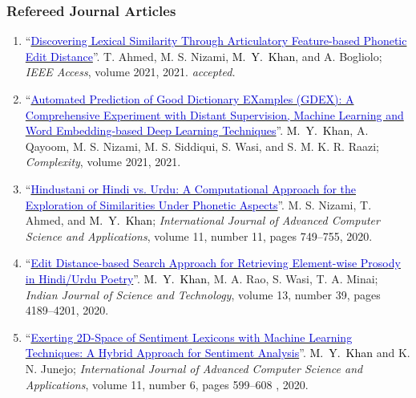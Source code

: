 \documentclass[a4paper, 10pt]{article}
\begin{document}
\subsubsection*{{ Refereed Journal Articles}}
\begin{enumerate}[J\arabic*.] 
\itemsep = 0em

\item ``\href{https://arxiv.org/abs/2008.06865}{\textcolor{MediumBlue}{Discovering Lexical Similarity Through Articulatory Feature-based Phonetic Edit Distance}}''. T. Ahmed, M. S. Nizami, \textcolor{Black}{M.~Y.~Khan}, and A. Bogliolo; \emph{IEEE Access}, volume 2021, 2021. \qonetag{\textcolor{white}{\textsf\bfseries Q1}}   {\small\it accepted.}

\item ``\href{https://doi.org/10.1155/2021/2553199}{\textcolor{MediumBlue}{Automated Prediction of Good Dictionary EXamples (GDEX): A Comprehensive Experiment with Distant Supervision, Machine Learning and Word Embedding-based Deep Learning Techniques}}''. \textcolor{Black}{M.~Y.~Khan}, A. Qayoom, M. S. Nizami, M. S. Siddiqui, S. Wasi, and S. M. K. R. Raazi; \emph{Complexity}, volume 2021, 2021. \qonetag{\textcolor{white}{\textsf\bfseries Q1}}  

\item ``\href{https://dx.doi.org/10.14569/IJACSA.2020.0111191}{\textcolor{MediumBlue}{Hindustani or Hindi vs. Urdu: A Computational Approach for the Exploration of Similarities Under Phonetic Aspects}}''. M. S. Nizami, T. Ahmed, and \textcolor{Black}{M.~Y.~Khan}; \emph{International Journal of Advanced Computer Science and Applications}, volume 11, number 11, pages 749--755, 2020. \qthreetag{\textcolor{white}{\textsf\bfseries Q3}} 

\item ``\href{https://doi.org/10.17485/IJST/v13i39.1489}{\textcolor{MediumBlue}{Edit Distance-based Search Approach for Retrieving Element-wise Prosody in Hindi/Urdu Poetry}}''. \textcolor{Black}{M.~Y.~Khan}, M. A. Rao, S. Wasi, T. A. Minai; \emph{Indian Journal of Science and Technology}, volume 13, number 39, pages 4189--4201, 2020. 

\item ``\href{https://doi.org/10.14569/IJACSA.2020.0110672}{\textcolor{MediumBlue}{Exerting 2D-Space of Sentiment Lexicons with Machine Learning Techniques: A Hybrid Approach for Sentiment Analysis}}''. \textcolor{Black}{M.~Y.~Khan} and K. N. Junejo; \emph{International Journal of Advanced Computer Science and Applications}, volume 11, number 6, pages 599--608
, 2020. \qthreetag{\textcolor{white}{\textsf\bfseries Q3}} 


\end{enumerate}
\end{document}
